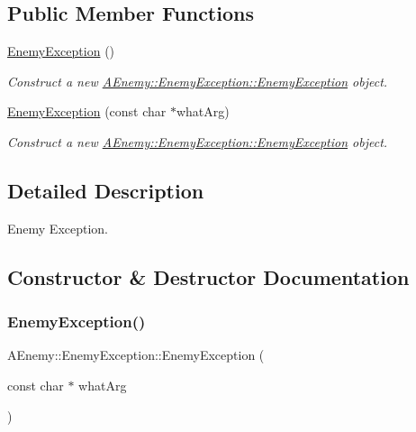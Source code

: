 \subsection*{Public Member Functions}
\begin{DoxyCompactItemize}
\item 
\mbox{\label{class_a_enemy_1_1_enemy_exception_aa463446d198b1ce403465ad67a4d5513}} 
\hyperlink{class_a_enemy_1_1_enemy_exception_aa463446d198b1ce403465ad67a4d5513}{Enemy\+Exception} ()
\begin{DoxyCompactList}\small\item\em Construct a new \hyperlink{class_a_enemy_1_1_enemy_exception_aa463446d198b1ce403465ad67a4d5513}{A\+Enemy\+::\+Enemy\+Exception\+::\+Enemy\+Exception} object. \end{DoxyCompactList}\item 
\hyperlink{class_a_enemy_1_1_enemy_exception_a6e949fef627b3947ca1f3e86de456aaf}{Enemy\+Exception} (const char $\ast$what\+Arg)
\begin{DoxyCompactList}\small\item\em Construct a new \hyperlink{class_a_enemy_1_1_enemy_exception_aa463446d198b1ce403465ad67a4d5513}{A\+Enemy\+::\+Enemy\+Exception\+::\+Enemy\+Exception} object. \end{DoxyCompactList}\end{DoxyCompactItemize}


\subsection{Detailed Description}
Enemy Exception. 

\subsection{Constructor \& Destructor Documentation}
\mbox{\label{class_a_enemy_1_1_enemy_exception_a6e949fef627b3947ca1f3e86de456aaf}} 
\subsubsection{\texorpdfstring{Enemy\+Exception()}{EnemyException()}}
{\footnotesize\ttfamily A\+Enemy\+::\+Enemy\+Exception\+::\+Enemy\+Exception (\begin{DoxyParamCaption}\item[{const char $\ast$}]{what\+Arg }\end{DoxyParamCaption})\hspace{0.3cm}{\ttfamily [explicit]}}



